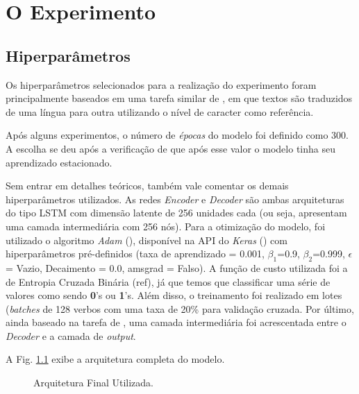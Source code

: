 \chapter{O Experimento}
\label{ch:07}


\section{Hiperparâmetros}
\label{sec:treinamento}

Os hiperparâmetros selecionados para a realização do experimento foram principalmente baseados em uma tarefa similar de \cite{cholletseq2seq}, em que textos são traduzidos de uma língua para outra utilizando o nível de caracter como referência.

Após alguns experimentos, o número de \textit{épocas} do modelo foi definido como 300. A escolha se deu após a verificação de que após esse valor o modelo tinha seu aprendizado estacionado.

Sem entrar em detalhes teóricos, também vale comentar os demais hiperparâmetros utilizados. As redes \textit{Encoder} e \textit{Decoder} são ambas arquiteturas do tipo LSTM com dimensão latente de 256 unidades cada (ou seja, apresentam uma camada intermediária com 256 nós). Para a otimização do modelo, foi utilizado o algoritmo \textit{Adam} (\cite{adam:2014}), disponível na API do \textit{Keras} (\cite{chollet2015keras}) com hiperparâmetros pré-definidos (taxa de aprendizado = 0.001, $\beta_{1}$=0.9, $\beta_{2}$=0.999, $\epsilon$ = Vazio, Decaimento = 0.0, amsgrad = Falso). A função de custo utilizada foi a de Entropia Cruzada Binária (ref), já que temos que classificar uma série de valores como sendo \textbf{0}'s ou \textbf{1}'s. Além disso, o treinamento foi realizado em lotes (\textit{batches} de 128 verbos com uma taxa de 20\% para validação cruzada. Por último, ainda baseado na tarefa de \cite{cholletseq2seq}, uma camada intermediária foi acrescentada entre o \textit{Decoder} e a camada de \textit{output}.

A Fig. \ref{fig:encoder-decoder} exibe a arquitetura completa do modelo.

\begin{figure}[!htb]
\caption{\label{fig:encoder-decoder} Arquitetura Final Utilizada.}
\end{figure}

